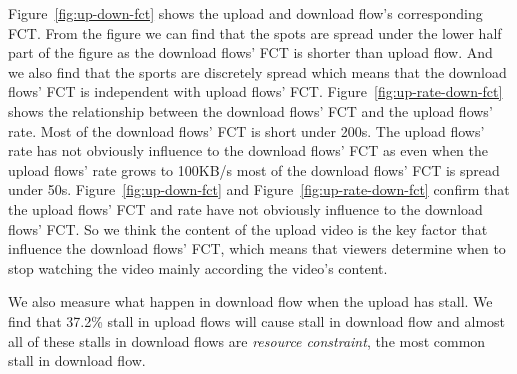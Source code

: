 Figure~\ref{fig:up-down-fct} shows the  upload and download flow's corresponding FCT. From the figure we can find that the spots are spread under the lower half part of the figure as the download flows' FCT is shorter than upload flow. And we also find that the sports are discretely spread which means that the download flows' FCT is independent with upload flows' FCT. Figure~\ref{fig:up-rate-down-fct} shows the relationship between the download flows' FCT and the upload flows' rate. Most of the download flows' FCT is short under 200s. The upload flows' rate has not obviously influence to the download flows' FCT as even when the upload flows' rate grows to 100KB/s most of the download flows' FCT is spread under 50s. Figure~\ref{fig:up-down-fct} and Figure~\ref{fig:up-rate-down-fct} confirm that the upload flows' FCT and rate have not obviously influence to the download flows' FCT. So we think the content of the upload video is the key factor that influence the download flows' FCT, which means that viewers determine when to stop watching the video mainly according the video's content. 


We also measure what happen in download flow when the upload has stall. We find that 37.2\% stall in upload flows will cause stall in download flow and almost all of these stalls in download flows are  \emph{resource constraint}, the most common stall in download flow. 














